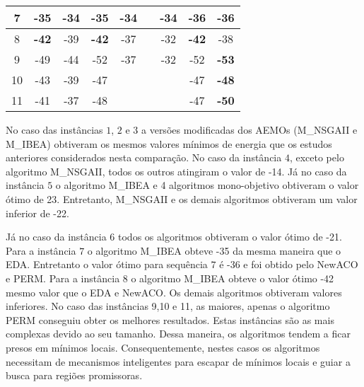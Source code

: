\begin{table}[htb]
\begin{tabular}{ccccccccc}
		\multicolumn{1}{c}{7} & -35          & -34          & -35          & -34          &              & -34          & \textbf{-36} & \textbf{-36} \\ \hline
	
	\multicolumn{1}{c}{8}                     & \textbf{-42} & -39          & \textbf{-42} & -37          &              & -32          & \textbf{-42} & -38          \\ \hline
		
		9                    & -49 & -44          & -52 & -37          &              & -32          & -52 & \textbf{-53}          \\ \hline
		
		10                    & -43 & -39          & -47 &          &              &           & -47 & \textbf{-48}          \\ \hline
		
		11                    & -41 & -37          & -48  &          &              &           & -47 & \textbf{-50}          \\ \hline
	\end{tabular}
\end{table}

No caso das instâncias $1$, $2$ e $3$ a versões modificadas dos AEMOs (M\_NSGAII e M\_IBEA) obtiveram os mesmos valores mínimos de energia que os estudos  anteriores considerados nesta comparação. No caso da instância $4$, exceto pelo algoritmo M\_NSGAII, todos os outros atingiram o valor de -14. Já no caso da instância $5$ o algoritmo M\_IBEA e 4 algoritmos mono-objetivo obtiveram o valor ótimo de 23. Entretanto, M\_NSGAII e os demais algoritmos obtiveram um valor inferior de -22.    

Já no caso da instância $6$ todos os algoritmos obtiveram o valor ótimo de -21. Para a instância $7$ o algoritmo M\_IBEA obteve -35 da mesma maneira que o EDA. Entretanto o valor ótimo para sequência $7$ é -36 e foi obtido pelo NewACO e PERM. Para a instância $8$ o algoritmo M\_IBEA obteve o valor ótimo -42 mesmo valor que o EDA  e NewACO. Os demais algoritmos obtiveram valores inferiores. No caso das instâncias 9,10 e 11, as maiores, apenas o algoritmo PERM conseguiu obter os melhores resultados. Estas instâncias são as mais complexas devido ao seu tamanho. Dessa maneira, os algoritmos tendem a ficar presos em mínimos locais. Consequentemente, nestes casos os algoritmos necessitam de mecanismos inteligentes para escapar de mínimos locais e guiar a busca para regiões promissoras.

